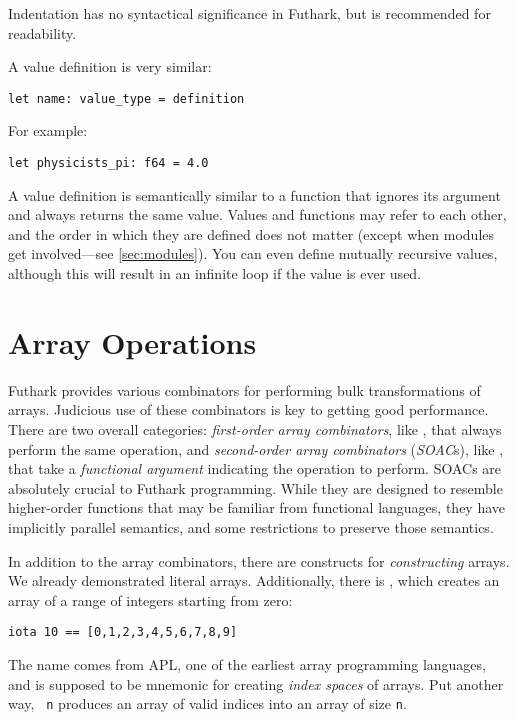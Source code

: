 \documentclass[oneside,11pt]{book}
\begin{document}
\noindent
Indentation has no syntactical significance in Futhark, but is
recommended for readability.

A value definition is very similar:

\begin{lstlisting}
let name: value_type = definition
\end{lstlisting}

\noindent
For example:

\begin{lstlisting}
let physicists_pi: f64 = 4.0
\end{lstlisting}

A value definition is semantically similar to a function that ignores
its argument and always returns the same value.  Values and functions
may refer to each other, and the order in which they are defined does
not matter (except when modules get involved---see \ref{sec:modules}).
You can even define mutually recursive values, although this will
result in an infinite loop if the value is ever used.

\section{Array Operations}

Futhark provides various combinators for performing bulk
transformations of arrays.  Judicious use of these combinators is key
to getting good performance.  There are two overall categories:
\textit{first-order array combinators}, like , that
always perform the same operation, and \textit{second-order array
  combinators} (\textit{SOAC}s), like , that take a
\textit{functional argument} indicating the operation to perform.
SOACs are absolutely crucial to Futhark programming.  While they are
designed to resemble higher-order functions that may be familiar from
functional languages, they have implicitly parallel semantics, and
some restrictions to preserve those semantics.

In addition to the array combinators, there are constructs for
\textit{constructing} arrays.  We already demonstrated literal arrays.
Additionally, there is , which creates an array of a
range of integers starting from zero:

\begin{lstlisting}
iota 10 == [0,1,2,3,4,5,6,7,8,9]
\end{lstlisting}

The name  comes from APL, one of the earliest array
programming languages, and is supposed to be mnemonic for creating
\textit{index spaces} of arrays.  Put another way, \texttt{ n}
produces an array of valid indices into an array of size \texttt{n}.
\end{document}
